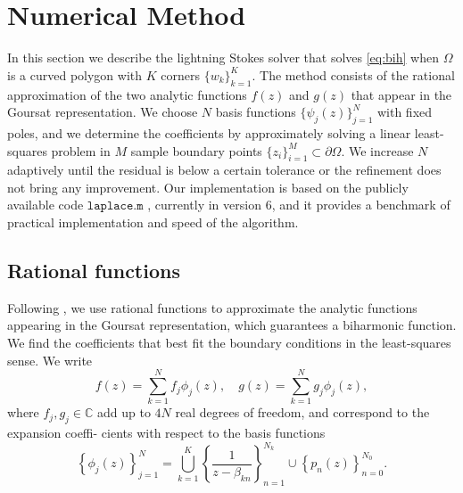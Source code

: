 
\section{Numerical Method \label{sec:method}}
In this section we describe the lightning Stokes solver that solves \eqref{eq:bih} when $\Omega$ is a curved polygon with $K$ corners $\{w_k\}_{k=1}^K$. The method consists of the rational approximation of the two analytic functions $f(z)$ and $g(z)$ that appear in the Goursat representation. We choose $N$ basis functions $\{\psi_j(z)\}_{j=1}^N$ with fixed poles, and we determine the coefficients by approximately solving a linear least-squares problem in $M$ sample boundary points $\{z_i\}_{i=1}^M \subset \partial\Omega$. We increase $N$ adaptively until the residual is below a certain tolerance or the refinement does not bring any improvement. Our implementation is based on the publicly available code $\texttt{laplace.m}$ \cite{tref20}, currently in version 6, and it provides a benchmark of practical implementation and speed of the algorithm.


\subsection{Rational functions}
Following \cite{Gopal19}, we use rational functions to approximate the analytic functions appearing in the
Goursat representation, which guarantees a biharmonic function. We find the coefficients that
best fit the boundary conditions in the least-squares sense. We write
\begin{equation}
f(z) = \sum_{k=1}^N f_j \phi_j(z), \quad g(z) = \sum_{k=1}^N g_j \phi_j(z),
\end{equation}
where $f_j, g_j\in \mathbb{C}$ add up to $4N$ real degrees of freedom, and correspond to the expansion coeffi- cients with respect to the basis functions
\begin{equation}
\left\{\phi_j(z)\right\}_{j=1}^{N} =  \bigcup_{k=1}^K\left\{\frac{1}{z-\beta_{kn}}\right\}_{n=1}^{N_k} \cup \left\{p_n(z)\right\}_{n=0}^{N_0}.
\end{equation}

